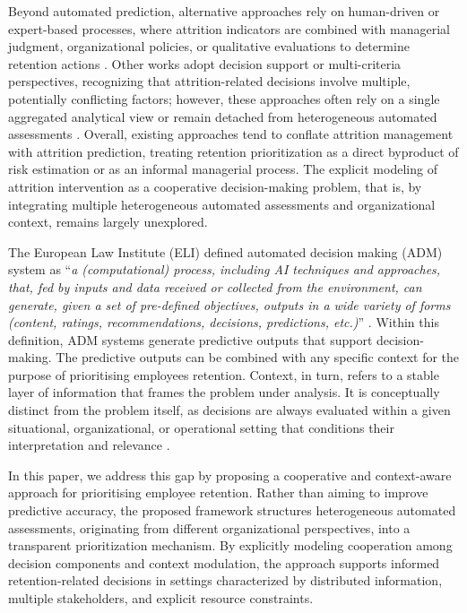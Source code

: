 \documentclass[runningheads]{llncs}
\begin{document}
Beyond automated prediction, alternative approaches rely on human-driven or expert-based processes, where attrition indicators are combined with managerial judgment, organizational policies, or qualitative evaluations to determine retention actions \cite{ref_mitravinda2022}.
Other works adopt decision support or multi-criteria perspectives, recognizing that attrition-related decisions involve multiple, potentially conflicting factors; however, these approaches often rely on a single aggregated analytical view or remain detached from heterogeneous automated assessments \cite{ref_manafi2025}.
Overall, existing approaches tend to conflate attrition management with attrition prediction, treating retention prioritization as a direct byproduct of risk estimation or as an informal managerial process.
The explicit modeling of attrition intervention as a cooperative decision-making problem, that is, by integrating multiple heterogeneous automated assessments and organizational context, remains largely unexplored.

The European Law Institute (ELI) defined automated decision making (ADM) system as ``\textit{a (computational) process, including AI techniques and approaches, that, fed by inputs and data received or collected from the environment, can generate, given a set of pre-defined objectives, outputs in a wide variety of forms (content, ratings, recommendations, decisions, predictions, etc.)}'' \cite{ref_eli2022_innovation}. Within this definition, ADM systems generate predictive outputs that support decision-making. The predictive outputs can be combined with any specific context for the purpose of prioritising employees retention. 
Context, in turn, refers to a stable layer of information that frames the problem under analysis. It is conceptually distinct from the problem itself, as decisions are always evaluated within a given situational, organizational, or operational setting that conditions their interpretation and relevance \cite{ref_dourish2004,ref_lamata2020}.

In this paper, we address this gap by proposing a cooperative and context-aware approach for prioritising employee retention.
Rather than aiming to improve predictive accuracy, the proposed framework structures heterogeneous automated assessments, originating from different organizational perspectives, into a transparent prioritization mechanism.
By explicitly modeling cooperation among decision components and context modulation, the approach supports informed retention-related decisions in settings characterized by distributed information, multiple stakeholders, and explicit resource constraints.
\end{document}

